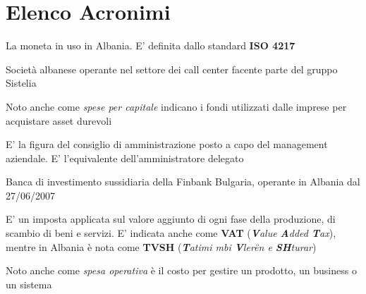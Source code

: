 \section*{Elenco Acronimi}
\begin{acronym}
\begin{multicols}{2}
		   {\newline \small La moneta in uso in Albania. E' definita dallo standard \textbf{ISO 4217}  \par}

		   {\newline \small Società albanese operante nel settore dei call center facente parte del gruppo Sistelia \par}

		   {\newline \small Noto anche come \textit{spese per capitale} indicano i fondi utilizzati dalle imprese per acquistare asset durevoli  \par}

		   {\newline \small E' la figura del consiglio di amministrazione posto a capo del management aziendale. E' l'equivalente dell'amministratore delegato  \par}

		   {\newline \small Banca di investimento sussidiaria della Finbank Bulgaria, operante in Albania dal 27/06/2007\cite{finbank_al} \par}


		   {\newline \small E' un imposta applicata sul valore aggiunto di ogni fase della produzione, di scambio di beni e servizi. E' indicata anche come \textbf{VAT} (\textit{\textbf{V}alue \textbf{A}dded \textbf{T}ax}), mentre in Albania è nota come \textbf{TVSH} (\textit{\textbf{T}atimi mbi \textbf{V}ler\"en e \textbf{SH}turar}) \par}

		   {\newline \small Noto anche come \textit{spesa operativa} è il costo per gestire un prodotto, un business o un sistema \par}


\end{multicols}
\end{acronym}
